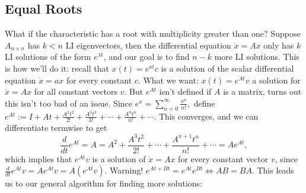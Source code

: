\subsection{Equal Roots}
What if the characteristic has a root with multiplicity greater than one? Suppose $A_{n\times n}$ has $k<n$ LI eigenvectors, then the differential equation $\dot x=Ax$ only has $k$ LI solutions of the form $e^{\lambda t}$, and our goal is to find $n-k$ more LI solutions. This is how we'll do it: recall that $x(t)=e^{at}c$ is a solution of the scalar differential equation $\dot x=ax$ for every constant $c$. What we want: $x(t)=e^{At}v$ a solution for $\dot x=Ax$ for all constant vectors $v$. But $e^{At}$ isn't defined if $A$ is a matrix, turns out this isn't too bad of an issue.
Since $e^x=\sum_{n=0}^{\infty} \frac{x^n }{n!},$ define $e^{At}:=I+At+\frac{A^2t^2}{2!}+\frac{A^3t^3}{3!}+\cdots +\frac{A^n  t^n}{n!}+\cdots $. This converges, and we can differentiate termwise to get \[
\frac{d}{dt}e^{At}=A=A^2+\frac{A^3t^2}{2!}+\cdots +\frac{A^{n+1}t ^n }{n!}+\cdots =Ae^{At},
\] which implies that $e^{At}v$ is a solution of $\dot x=Ax$ for every constant vector $v$, since $\frac{d}{dt}e^{At}v=Ae^{At}v=A(e^{At}v)$. Warning! $e^{At+Bt}=e^{At}e^{Bt}\iff AB=BA$. This leads us to our general algorithm for finding more solutions:
